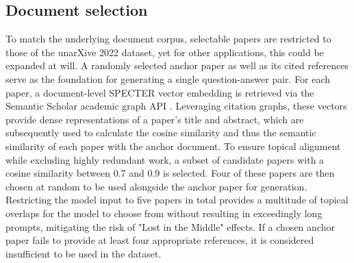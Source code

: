 \subsection{Document selection}
To match the underlying document corpus, selectable papers are restricted to those of the unarXive 2022 dataset, yet for other applications, this could be expanded at will. A randomly selected anchor paper as well as its cited references serve as the foundation for generating a single question-answer pair. For each paper, a document-level SPECTER \cite{specter} vector embedding is retrieved via the Semantic Scholar academic graph API \cite{semanticScholarApi}. Leveraging citation graphs, these vectors provide dense representations of a paper's title and abstract, which are subsequently used to calculate the cosine similarity and thus the semantic similarity of each paper with the anchor document. To ensure topical alignment while excluding highly redundant work, a subset of candidate papers with a cosine similarity between 0.7 and 0.9 is selected. Four of these papers are then chosen at random to be used alongside the anchor paper for generation. Restricting the model input to five papers in total provides a multitude of topical overlaps for the model to choose from without resulting in exceedingly long prompts, mitigating the risk of "Lost in the Middle" effects. If a chosen anchor paper fails to provide at least four appropriate references, it is considered insufficient to be used in the dataset.

